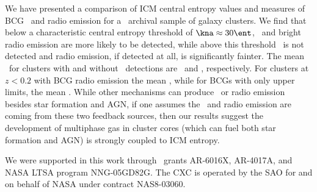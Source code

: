 \documentclass{emulateapj}
\begin{document}
We have presented a comparison of ICM central entropy values and
measures of BCG \halpha\ and radio emission for a \Chandra\ archival
sample of galaxy clusters. We find that below a characteristic central
entropy threshold of $\kna \approx 30 \ent$, \halpha\ and bright radio
emission are more likely to be detected, while above this threshold
\halpha\ is not detected and radio emission, if detected at all, is
significantly fainter. The mean \kna\ for clusters with and without
\halpha\ detections are \fha\ and \nfha, respectively. For clusters at
$z < 0.2$ with BCG radio emission the mean \frad, while for BCGs with
only upper limits, the mean \nfrad. While other mechanisms can produce
\halpha\ or radio emission besides star formation and AGN, if one
assumes the \halpha\ and radio emission are coming from these two
feedback sources, then our results suggest the development of
multiphase gas in cluster cores (which can fuel both star formation
and AGN) is strongly coupled to ICM entropy.

\acknowledgements
We were supported in this work through \Chandra\ grants AR-6016X,
AR-4017A, and NASA LTSA program NNG-05GD82G. The CXC is operated by
the SAO for and on behalf of NASA under contract NAS8-03060.



\end{document}
